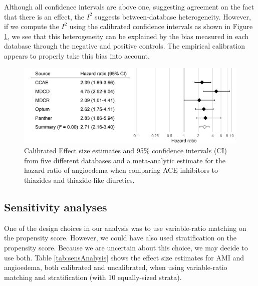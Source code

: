\documentclass[11pt]{book}
\theoremstyle{definition}
\theoremstyle{definition}
\theoremstyle{definition}
\theoremstyle{remark}
\begin{document}
Although all confidence intervals are above one, suggesting agreement on the fact that there is an effect, the \(I^2\) suggests between-database heterogeneity. However, if we compute the \(I^2\) using the calibrated confidence intervals as shown in Figure \ref{fig:forestCal}, we see that this heterogeneity can be explained by the bias measured in each database through the negative and positive controls. The empirical calibration appears to properly take this bias into account.

\begin{figure}

{\centering \includegraphics[width=0.9\linewidth]{images/MethodValidity/forestCal} 

}

\caption{Calibrated Effect size estimates and 95\% confidence intervals (CI) from five different databases and a meta-analytic estimate for the hazard ratio of angioedema when comparing ACE inhibitors to thiazides and thiazide-like diuretics.}\label{fig:forestCal}
\end{figure}

\hypertarget{sensitivity-analyses-1}{%
\subsection{Sensitivity analyses}\label{sensitivity-analyses-1}}

One of the design choices in our analysis was to use variable-ratio matching on the propensity score. However, we could have also used stratification on the propensity score. Because we are uncertain about this choice, we may decide to use both. Table \ref{tab:sensAnalysis} shows the effect size estimates for AMI and angioedema, both calibrated and uncalibrated, when using variable-ratio matching and stratification (with 10 equally-sized strata).
\end{document}
